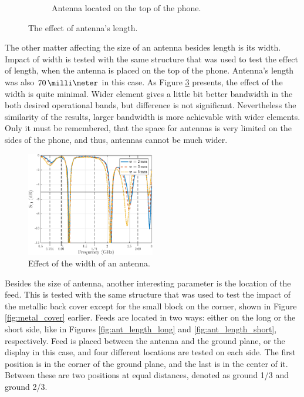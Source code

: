\begin{figure}[H]
\begin{subfigure}[b]{0.49\textwidth}
        \caption{Antenna located on the top of the phone.}
        \label{fig:ant_length_short_res}
    \end{subfigure}
    \caption{The effect of antenna's length.}
    \label{fig:ant_length_result}
\end{figure}

The other matter affecting the size of an antenna besides length is its width. Impact of width is tested with the same structure that was used to test the effect of length, when the antenna is placed on the top of the phone. Antenna's length was also $70\,\milli\meter$ in this case. As Figure \ref{fig:width_res} presents, the effect of the width is quite minimal. Wider element gives a little bit better bandwidth in the both desired operational bands, but difference is not significant. Nevertheless the similarity of the results, larger bandwidth is more achievable with wider elements. Only it must be remembered, that the space for antennas is very limited on the sides of the phone, and thus, antennas cannot be much wider.

\begin{figure}[H]
    \centering
    \includegraphics[width=0.5\textwidth]{img/width_res.eps}
    \caption{Effect of the width of an antenna.}
    \label{fig:width_res}
\end{figure}

Besides the size of antenna, another interesting parameter is the location of the feed. This is tested with the same structure that was used to test the impact of the metallic back cover except for the small block on the corner, shown in Figure \ref{fig:metal_cover} earlier. Feeds are located in two ways: either on the long or the short side, like in Figures \ref{fig:ant_length_long} and \ref{fig:ant_length_short}, respectively. Feed is placed between the antenna and the ground plane, or the display in this case, and four different locations are tested on each side. The first position is in the corner of the ground plane, and the last is in the center of it. Between these are two positions at equal distances, denoted as ground 1/3 and ground 2/3.

